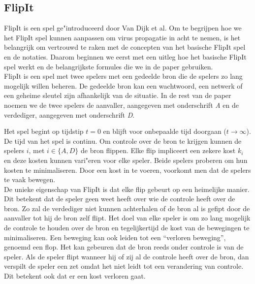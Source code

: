 \documentclass[master=cws, masteroption=vs,english]{kulemt}
\begin{document}
\begin{abstract*}
\subsection{FlipIt}
FlipIt is een spel ge"introduceerd door Van Dijk et al. Om te begrijpen hoe we het FlipIt spel kunnen aanpassen om virus propagatie in acht te nemen, is het belangrijk om vertrouwd te raken met de concepten van het basische FlipIt spel en de notaties. Daarom beginnen we eerst met een uitleg hoe het basische FlipIt spel werkt en de belangrijkste formules die we in de paper gebruiken. \\

FlipIt is een spel met twee spelers met een gedeelde bron die de spelers zo lang mogelijk willen beheren. De gedeelde bron kan een wachtwoord, een netwerk of een geheime sleutel zijn afhankelijk van de situatie. In de rest van de paper noemen we de twee spelers de aanvaller, aangegeven met onderschrift  \textit{A} en de verdediger, aangegeven met onderschrift \textit{D}.

Het spel begint op tijdstip $ t = 0 $ en blijft voor onbepaalde tijd doorgaan ($ t \rightarrow \infty $). De tijd van het spel is continu. Om controle over de bron te krijgen kunnen de spelers $i$, met $ i \in \{A, D \} $ de bron flippen. Elke flip impliceert een zekere kost $ k_{i} $ en deze kosten kunnen vari"eren voor elke speler. Beide spelers proberen om hun kosten te minimaliseren. Door een kost in te voeren, voorkomt men dat de spelers te vaak bewegen. \\

De unieke eigenschap van FlipIt is dat elke flip gebeurt op een heimelijke manier. Dit betekent dat de speler geen weet heeft over wie de controle heeft over de bron. Zo zal de verdediger niet kunnen achterhalen of de bron al is gefipt door de aanvaller tot hij de bron zelf flipt. Het doel van elke speler is om zo lang mogelijk de controle te houden over de bron en tegelijkertijd de kost van de bewegingen te minimaliseren. Een beweging kan ook leiden tot een ``verloren beweging'', genoemd een flop. Het kan gebeuren dat de bron reeds onder controle is van de speler. Als de speler flipt wanneer hij of zij al de controle  heeft over de bron, dan verspilt de speler een zet omdat het niet leidt tot een verandering van controle. Dit betekent ook dat er een kost verloren gaat. \\



\end{abstract*}
\end{document}

